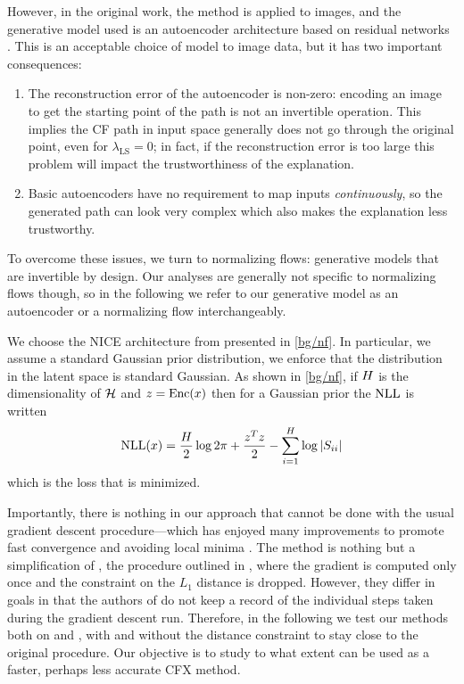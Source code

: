 \documentclass[../main.tex]{subfiles}
\begin{document}
However, in the original \ls{} work, the method is applied to images, and the generative model used is an autoencoder architecture based on residual networks \cite{heDeep2015}.
This is an acceptable choice of model to image data, but it has two important consequences:
\begin{enumerate}
	\item The reconstruction error of the autoencoder is non-zero: encoding an image to get the starting point of the path is not an invertible operation.
	      This implies the CF path in input space generally does not go through the original point, even for $\lambda_\text{LS} = 0$; in fact, if the reconstruction error is too large this problem will impact the trustworthiness of the explanation.

	\item Basic autoencoders have no requirement to map inputs \emph{continuously}, so the generated path can look very complex which also makes the explanation less trustworthy.
\end{enumerate}

To overcome these issues, we turn to normalizing flows: generative models that are invertible by design.
Our analyses are generally not specific to normalizing flows though, so in the following we refer to our generative model as an autoencoder or a normalizing flow interchangeably.

We choose the NICE architecture from \cite{dinhNICE2015} presented in \autoref{bg/nf}.
In particular, we assume a standard Gaussian prior distribution, \ie{} we enforce that the distribution in the latent space is standard Gaussian.
As shown in \autoref{bg/nf}, if $H$ is the dimensionality of $\mathcal{H}$ and $z = \operatorname{Enc}(x)$ then for a Gaussian prior the $\text{NLL}$ is written
\begin{align*}
\text{NLL}(x) = \frac{H}{2} \log 2 \pi
    +  \frac{z^T z}{2}
    - \sum_{i=1}^H \log \left\lvert S_{ii}\right\rvert
\end{align*}
which is the loss that is minimized.

Importantly, there is nothing in our approach that cannot be done with the usual gradient descent procedure---which has enjoyed many improvements to promote fast convergence and avoiding local minima \cite{kingmaAdam2014}.
The \ls{} method is nothing but a simplification of \revise{}, the procedure outlined in \cite{joshiRealistic2019},
where the gradient is computed only once and the constraint on the $L_1$ distance is dropped.
However, they differ in goals in that the authors of \cite{joshiRealistic2019} do not keep a record of the individual
steps taken during the gradient descent run.
Therefore, in the following we test our methods both on \ls{} and \revise{}, with and without the distance constraint
to stay close to the original \revise{} procedure.
Our objective is to study to what extent \ls{} can be used as a faster, perhaps less accurate CFX method.
\end{document}
